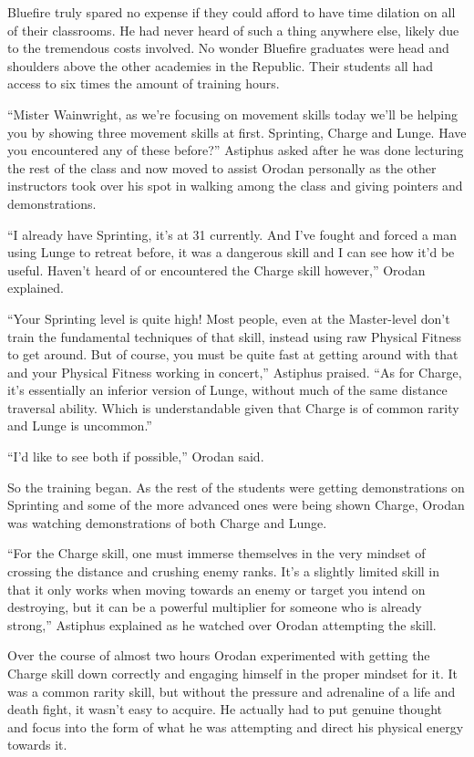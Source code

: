 \documentclass[a4paper,10pt]{book}
\begin{document}
Bluefire truly spared no expense if they could afford to have time dilation on all of their classrooms. He had never heard of such a thing anywhere else, likely due to the tremendous costs involved. No wonder Bluefire graduates were head and shoulders above the other academies in the Republic. Their students all had access to six times the amount of training hours.\par
“Mister Wainwright, as we’re focusing on movement skills today we’ll be helping you by showing three movement skills at first. Sprinting, Charge and Lunge. Have you encountered any of these before?” Astiphus asked after he was done lecturing the rest of the class and now moved to assist Orodan personally as the other instructors took over his spot in walking among the class and giving pointers and demonstrations.\par
“I already have Sprinting, it’s at 31 currently. And I’ve fought and forced a man using Lunge to retreat before, it was a dangerous skill and I can see how it’d be useful. Haven’t heard of or encountered the Charge skill however,” Orodan explained.\par
“Your Sprinting level is quite high! Most people, even at the Master-level don’t train the fundamental techniques of that skill, instead using raw Physical Fitness to get around. But of course, you must be quite fast at getting around with that and your Physical Fitness working in concert,” Astiphus praised. “As for Charge, it’s essentially an inferior version of Lunge, without much of the same distance traversal ability. Which is understandable given that Charge is of common rarity and Lunge is uncommon.”\par
“I’d like to see both if possible,” Orodan said.\par
So the training began. As the rest of the students were getting demonstrations on Sprinting and some of the more advanced ones were being shown Charge, Orodan was watching demonstrations of both Charge and Lunge.\par
“For the Charge skill, one must immerse themselves in the very mindset of crossing the distance and crushing enemy ranks. It’s a slightly limited skill in that it only works when moving towards an enemy or target you intend on destroying, but it can be a powerful multiplier for someone who is already strong,” Astiphus explained as he watched over Orodan attempting the skill.\par
Over the course of almost two hours Orodan experimented with getting the Charge skill down correctly and engaging himself in the proper mindset for it. It was a common rarity skill, but without the pressure and adrenaline of a life and death fight, it wasn’t easy to acquire. He actually had to put genuine thought and focus into the form of what he was attempting and direct his physical energy towards it.\par
\end{document}
